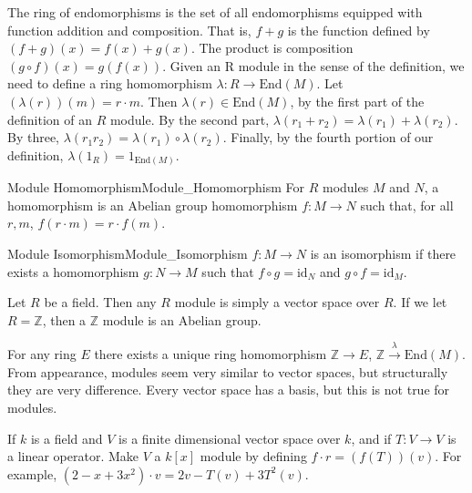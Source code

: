 \documentclass[crop=false,class=book,oneside]{standalone}                  %
\begin{document}
        The ring of endomorphisms is the set of all endomorphisms equipped
        with function addition and composition. That is,
        $f+g$ is the function defined by $(f+g)(x)=f(x)+g(x)$. The product
        is composition $(g\circ{f})(x)=g(f(x))$.
        Given an R module in the sense of the definition, we need to define
        a ring homomorphism $\lambda:R\rightarrow\textrm{End}(M)$.
        Let $(\lambda(r))(m)=r\cdot{m}$. Then $\lambda(r)\in\textrm{End}(M)$,
        by the first part of the definition of an $R$ module. By the second
        part, $\lambda(r_{1}+r_{2})=\lambda(r_{1})+\lambda(r_{2})$. By three,
        $\lambda(r_{1}r_{2})=\lambda(r_{1})\circ\lambda(r_{2})$. Finally, by
        the fourth portion of our definition,
        $\lambda(1_{R})=1_{\textrm{End}(M)}$.
        \begin{ldefinition}{Module Homomorphism}{Module_Homomorphism}
            For $R$ modules $M$ and $N$, a homomorphism is an Abelian group
            homomorphism $f:M\rightarrow{N}$ such that, for all $r,m$,
            $f(r\cdot{m})=r\cdot{f}(m)$.
        \end{ldefinition}
        \begin{ldefinition}{Module Isomorphism}{Module_Isomorphism}
            $f:M\rightarrow{N}$ is an isomorphism if there exists a
            homomorphism $g:N\rightarrow{M}$ such that
            $f\circ{g}=\textrm{id}_{N}$ and $g\circ{f}=\textrm{id}_{M}$.
        \end{ldefinition}
        \begin{example}
            Let $R$ be a field. Then any $R$ module is simply a vector space
            over $R$. If we let $R=\mathbb{Z}$, then a $\mathbb{Z}$ module
            is an Abelian group.
        \end{example}
        For any ring $E$ there exists a unique ring homomorphism
        $\mathbb{Z}\rightarrow{E}$,
        $\mathbb{Z}\overset{\lambda}{\rightarrow}\textrm{End}(M)$.
        From appearance, modules seem very similar to vector spaces, but
        structurally they are very difference. Every vector space has a
        basis, but this is not true for modules.
        \begin{lexample}{}{}
            If $k$ is a field and $V$ is a finite dimensional vector space
            over $k$, and if $T:V\rightarrow{V}$ is a linear operator. Make
            $V$ a $k[x]$ module by defining $f\cdot{r}=(f(T))(v)$. For
            example, $(2-x+3x^2)\cdot{v}=2v-T(v)+3T^{2}(v)$.
        \end{lexample}
\end{document}
